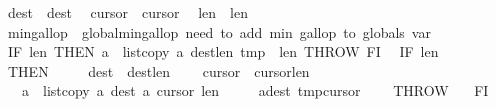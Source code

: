 \begin{isabellebody}
\ \ {\isasymacute}dest\ {\isacharcolon}{\isacharequal}{\isacharequal}\ {\isasymacute}dest{\isacharminus}{}{\isacharsemicolon}{\isacharsemicolon}\isanewline
\ \ {\isasymacute}cursor{}\ {\isacharcolon}{\isacharequal}{\isacharequal}\ {\isasymacute}cursor{}{\isacharminus}{}{\isacharsemicolon}{\isacharsemicolon}\isanewline
\ \ {\isasymacute}len{}\ {\isacharcolon}{\isacharequal}{\isacharequal}\ {\isasymacute}len{}{\isacharminus}{}{\isacharsemicolon}{\isacharsemicolon}\isanewline
\ \ {\isasymacute}min{\isacharunderscore}gallop\ {\isacharcolon}{\isacharequal}{\isacharequal}\ {\isasymacute}global{\isacharunderscore}min{\isacharunderscore}gallop{\isacharsemicolon}{\isacharsemicolon}{\isacharparenleft}{\isacharasterisk}\ need\ to\ add\ min\ gallop\ to\ globals\ var\ {\isacharasterisk}{\isacharparenright}\isanewline
\ \ IF\ {\isasymacute}len{}{\isacharequal}{}\ THEN\ {\isasymacute}a\ {\isacharcolon}{\isacharequal}{\isacharequal}\ list{\isacharunderscore}copy\ {\isasymacute}a\ {\isacharparenleft}{\isasymacute}dest{\isacharminus}{\isacharparenleft}{\isasymacute}len{}{\isacharminus}{}{\isacharparenright}{\isacharparenright}\ {\isasymacute}tmp\ {}\ {\isasymacute}len{}{\isacharsemicolon}{\isacharsemicolon}\ THROW\ FI{\isacharsemicolon}{\isacharsemicolon}\isanewline
\ \ IF\ {\isasymacute}len{}{\isacharequal}{}\ \isanewline
\ \ THEN\ \isanewline
\ \ \ \ {\isasymacute}dest\ {\isacharcolon}{\isacharequal}{\isacharequal}\ {\isasymacute}dest{\isacharminus}{\isasymacute}len{}{\isacharsemicolon}{\isacharsemicolon}\isanewline
\ \ \ \ {\isasymacute}cursor{}\ {\isacharcolon}{\isacharequal}{\isacharequal}\ {\isasymacute}cursor{}{\isacharminus}{\isasymacute}len{}{\isacharsemicolon}{\isacharsemicolon}\isanewline
\ \ \ \ {\isasymacute}a\ {\isacharcolon}{\isacharequal}{\isacharequal}\ list{\isacharunderscore}copy\ {\isasymacute}a\ {\isacharparenleft}{\isasymacute}dest{\isacharplus}{}{\isacharparenright}\ {\isasymacute}a\ {\isacharparenleft}{\isasymacute}cursor{}{\isacharplus}{}{\isacharparenright}\ {\isasymacute}len{}{\isacharsemicolon}{\isacharsemicolon}\ \isanewline
\ \ \ \ {\isasymacute}a{\isacharbang}{\isasymacute}dest{\isacharcolon}{\isacharequal}{\isacharequal}\ {\isasymacute}tmp{\isacharbang}{\isasymacute}cursor{}{\isacharsemicolon}{\isacharsemicolon}\isanewline
\ \ \ \ THROW\ \isanewline
\ \ FI{\isacharsemicolon}{\isacharsemicolon}\isanewline

\end{isabellebody}
